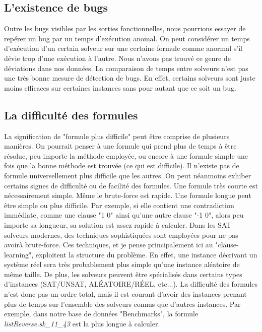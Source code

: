 \documentclass[11pt,a4paper]{article}
\begin{document}
\subsection{L'existence de bugs}
 
Outre les bugs visibles par les sorties fonctionnelles, nous pourrions essayer de repérer un bug par un temps d'exécution anomal. On peut considérer un temps d'exécution d'un certain solveur sur une certaine formule comme anormal s'il dévie trop d'une exécution à l'autre. Nous n'avons pas trouvé ce genre de déviations dans nos données. 
La comparaison de temps entre solveurs n'est pas une très bonne mesure de détection de bugs. En effet, certains solveurs sont juste moins efficaces sur certaines instances sans pour autant que ce soit un bug.


\subsection{La difficulté des formules}

 La signification de "formule plus difficile" peut être comprise de plusieurs manières. On pourrait penser à une formule qui prend plus de temps à être résolue, peu importe la méthode employée, ou encore à une formule simple une fois que la bonne méthode est trouvée (ce qui est difficile). 
 Il n'existe pas de formule universellement plus difficile que les autres. On peut néanmoins exhiber certains signes de difficulté ou de facilité des formules. 
 Une formule très courte est nécessairement simple. Même le brute-force est rapide.
 Une formule longue peut être simple ou plus difficile. Par exemple, si elle contient une contradiction immédiate, comme une clause "1 0" ainsi qu'une autre clause "-1 0", alors peu importe sa longueur, sa solution est assez rapide à calculer. Dans les SAT solveurs modernes, des techniques sophistiquées sont employées pour ne pas avoirà brute-force. Ces techniques, et je pense principalement ici au "clause-learning", exploitent la structure du problème. En effet, une instance décrivant un système réel sera très probablement plus simple qu'une instance aléatoire de même taille. 
De plus, les solveurs peuvent être spécialisés dans certains types d'instances (SAT/UNSAT, ALÉATOIRE/RÉEL, etc...).
La difficulté des formules n'est donc pas un ordre total, mais il est courant d'avoir des instances prenant plus de temps sur l'ensemble des solveurs connus que d'autres instances. Par exemple, dans notre base de données "Benchmarks", la formule \textit{listReverse.sk\_11\_43} est la plus longue à calculer.
\end{document}
